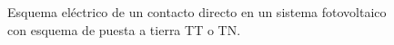 %
\begin{figure}
\hfill{}\hfill{}\hfill{}\hfill{}

\caption{\label{fig:ContactoDirectoTT_TN}Esquema eléctrico de un contacto
directo en un sistema fotovoltaico con esquema de puesta a tierra
TT o TN.}

\end{figure}


